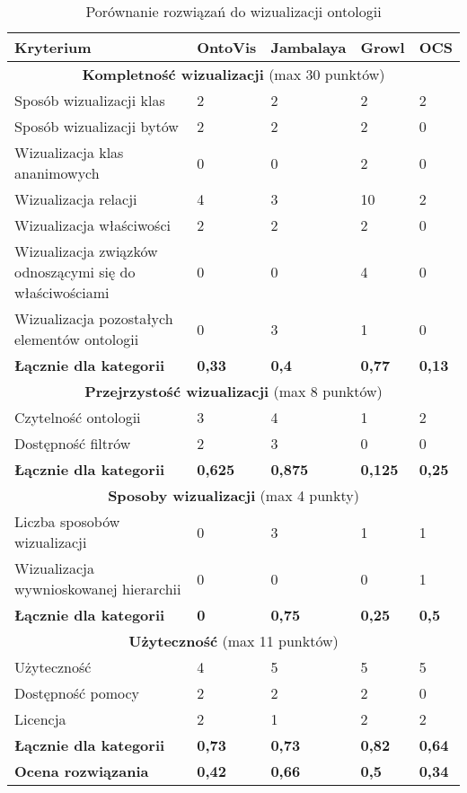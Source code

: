 \newpage
\begin{longtable}{|m{6cm}|m{2cm}|m{2cm}|m{2cm}|m{2cm}|}
\caption{Porównanie rozwiązań do wizualizacji ontologii}
\label{t:porownanie} \\
\hline
 Kryterium  &  OntoVis  &  Jambalaya &  Growl & OCS\\ \hline

 \multicolumn{5}{|c|}{{\bf Kompletność wizualizacji} (max 30 punktów)}  \\ \hline
Sposób wizualizacji klas	&  2  &  2  &  2  & 2 \\ \hline
Sposób wizualizacji bytów	&  2  &  2  &  2  & 0 \\ \hline
Wizualizacja klas ananimowych	&  0  &  0  &  2  & 0 \\ \hline
Wizualizacja relacji		&  4  &  3  &  10 & 2 \\ \hline
Wizualizacja właściwości	&  2  &  2  &  2  & 0 \\ \hline
Wizualizacja związków odnoszącymi
	   się do właściwościami&  0  &  0  &  4 & 0 \\ \hline
Wizualizacja pozostałych 
	  elementów ontologii   &  0  &  3  &  1 &  0\\ \hline
{\bf Łącznie dla kategorii}	&{\bf 0,33 }   &{\bf 0,4  }   & {\bf 0,77 }  & {\bf 0,13 } \\ \hline %
 \multicolumn{5}{|c|}{{\bf Przejrzystość wizualizacji} (max 8 punktów)}\\ \hline
Czytelność ontologii		& 3  &  4 &  1 &  2\\ \hline
Dostępność filtrów		& 2  &  3 &  0 &  0\\ \hline
{\bf Łącznie dla kategorii}	&{\bf 0,625 }   &{\bf 0,875 }   & {\bf 0,125 }  & {\bf 0,25 } \\ \hline %
 \multicolumn{5}{|c|}{{\bf Sposoby wizualizacji} (max 4 punkty)} \\ \hline
Liczba sposobów wizualizacji		&  0 &  3 &  1 & 1 \\ \hline
Wizualizacja wywnioskowanej hierarchii	&  0 &  0 &  0 & 1 \\ \hline
{\bf Łącznie dla kategorii}	&{\bf 0 }   &{\bf 0,75 }   & {\bf 0,25 }  & {\bf 0,5 } \\ \hline %
 \multicolumn{5}{|c|}{{\bf Użyteczność} (max 11 punktów)}\\ \hline
Użyteczność			&  4 &  5 &  5 & 5 \\ \hline
Dostępność pomocy		&  2 &  2 &  2 & 0\\ \hline
Licencja			&  2 &  1 &  2 & 2\\ \hline
{\bf Łącznie dla kategorii}	&{\bf 0,73 }   &{\bf 0,73 }   & {\bf 0,82 }  & {\bf 0,64 } \\ \hline %
{\bf Ocena rozwiązania}		&{\bf 0,42 }   &{\bf 0,66 }   & {\bf 0,5}  & {\bf 0,34 } \\ \hline
\end{longtable}

